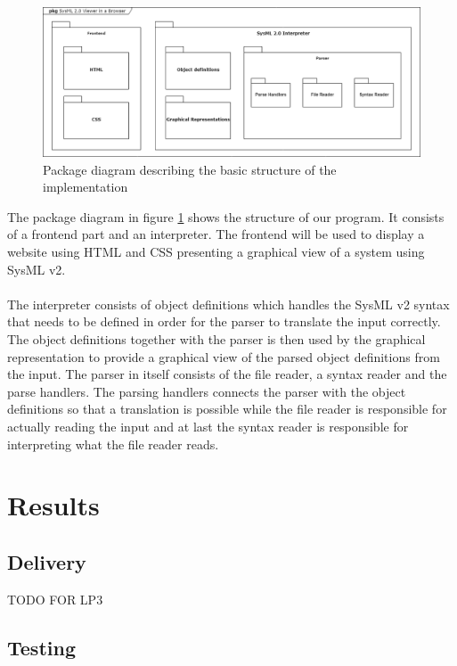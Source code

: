 \documentclass{article}
\begin{document}
\begin{figure}[H]
    \begin{center}
        \includegraphics[width=1\textwidth]{Packages_SysML-Project_first-draft.png}
        \caption{Package diagram describing the basic structure of the implementation}
        \label{package}
    \end{center}
\end{figure}

The package diagram in figure \ref{package} shows the structure of our program. It consists of a frontend part and an interpreter. The frontend will be used to display a website using HTML and CSS presenting a graphical view of a system using SysML v2. 
\\\\
The interpreter consists of object definitions which handles the SysML v2 syntax that needs to be defined in order for the parser to translate the input correctly. The object definitions together with the parser is then used by the graphical representation to provide a graphical view of the parsed object definitions from the input. The parser in itself consists of the file reader, a syntax reader and the parse handlers. The parsing handlers connects the parser with the object definitions so that a translation is possible while the file reader is responsible for actually reading the input and at last the syntax reader is responsible for interpreting what the file reader reads.

\newpage
\section{Results}

\subsection{Delivery}

TODO FOR LP3

\subsection{Testing}
\end{document}
